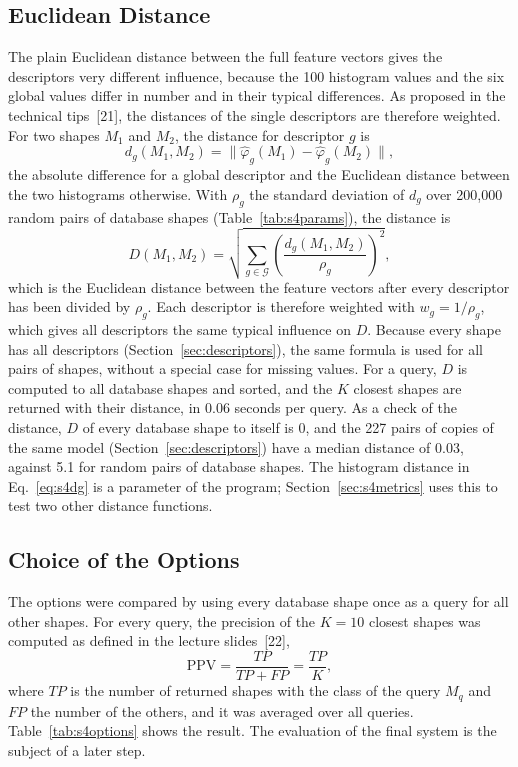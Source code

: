 \documentclass[10pt,a4paper]{article}
\begin{document}
\subsection{Euclidean Distance}\label{sec:s4dist}
The plain Euclidean distance between the full feature vectors gives the descriptors very different influence, because the 100
histogram values and the six global values differ in number and in their typical differences. As proposed in the technical
tips~[21], the distances of the single descriptors are therefore weighted. For two shapes $M_1$ and $M_2$, the distance for
descriptor $g$ is
\begin{equation}
d_g(M_1,M_2)=\big\lVert\hat\varphi_g(M_1)-\hat\varphi_g(M_2)\big\rVert,
\label{eq:s4dg}
\end{equation}
the absolute difference for a global descriptor and the Euclidean distance between the two histograms otherwise. With $\rho_g$
the standard deviation of $d_g$ over 200,000 random pairs of database shapes (Table~\ref{tab:s4params}), the distance is
\begin{equation}
D(M_1,M_2)=\sqrt{\sum_{g\in\mathcal{G}}\left(\frac{d_g(M_1,M_2)}{\rho_g}\right)^2},
\label{eq:s4D}
\end{equation}
which is the Euclidean distance between the feature vectors after every descriptor has been divided by $\rho_g$. Each descriptor
is therefore weighted with $w_g=1/\rho_g$, which gives all descriptors the same typical influence on $D$. Because every
shape has all descriptors (Section~\ref{sec:descriptors}), the same formula is used for all pairs of shapes, without a special
case for missing values. For a query, $D$ is computed to all database shapes and sorted, and
the $K$ closest shapes are returned with their distance, in 0.06 seconds per query. As a check of the distance, $D$ of every
database shape to itself is 0, and the 227 pairs of copies of the same model (Section~\ref{sec:descriptors}) have a median
distance of 0.03, against 5.1 for random pairs of database shapes. The histogram distance in
Eq.~\eqref{eq:s4dg} is a parameter of the program; Section~\ref{sec:s4metrics} uses this to test two other distance functions.

\subsection{Choice of the Options}\label{sec:s4compare}
The options were compared by using every database shape once as a query for all other shapes. For every query, the precision
of the $K=10$ closest shapes was computed as defined in the lecture slides~[22],
\begin{equation}
\mathrm{PPV}=\frac{TP}{TP+FP}=\frac{TP}{K},
\label{eq:s4ppv}
\end{equation}
where $TP$ is the number of returned shapes with the class of the query $M_q$ and $FP$ the number of the others, and it was
averaged over all queries. Table~\ref{tab:s4options} shows the result. The evaluation of the final system is the subject of a later step.
\end{document}
